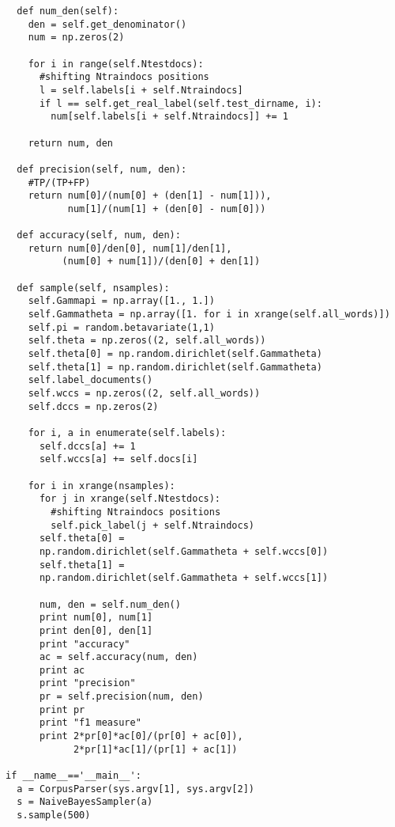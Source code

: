 \begin{lstlisting}
  def num_den(self):
    den = self.get_denominator()
    num = np.zeros(2)
    
    for i in range(self.Ntestdocs):
      #shifting Ntraindocs positions
      l = self.labels[i + self.Ntraindocs] 
      if l == self.get_real_label(self.test_dirname, i):
        num[self.labels[i + self.Ntraindocs]] += 1
    
    return num, den 

  def precision(self, num, den):
    #TP/(TP+FP)
    return num[0]/(num[0] + (den[1] - num[1])), 
           num[1]/(num[1] + (den[0] - num[0]))

  def accuracy(self, num, den):
    return num[0]/den[0], num[1]/den[1], 
          (num[0] + num[1])/(den[0] + den[1])
 
  def sample(self, nsamples):
    self.Gammapi = np.array([1., 1.])
    self.Gammatheta = np.array([1. for i in xrange(self.all_words)])
    self.pi = random.betavariate(1,1)
    self.theta = np.zeros((2, self.all_words)) 
    self.theta[0] = np.random.dirichlet(self.Gammatheta) 
    self.theta[1] = np.random.dirichlet(self.Gammatheta) 
    self.label_documents()
    self.wccs = np.zeros((2, self.all_words))
    self.dccs = np.zeros(2)

    for i, a in enumerate(self.labels):
      self.dccs[a] += 1
      self.wccs[a] += self.docs[i]

    for i in xrange(nsamples):
      for j in xrange(self.Ntestdocs):
        #shifting Ntraindocs positions
        self.pick_label(j + self.Ntraindocs) 
      self.theta[0] =
      np.random.dirichlet(self.Gammatheta + self.wccs[0])
      self.theta[1] = 
      np.random.dirichlet(self.Gammatheta + self.wccs[1])

      num, den = self.num_den()
      print num[0], num[1]
      print den[0], den[1]
      print "accuracy"
      ac = self.accuracy(num, den)
      print ac
      print "precision"
      pr = self.precision(num, den)
      print pr
      print "f1 measure"
      print 2*pr[0]*ac[0]/(pr[0] + ac[0]), 
            2*pr[1]*ac[1]/(pr[1] + ac[1]) 

if __name__=='__main__':
  a = CorpusParser(sys.argv[1], sys.argv[2]) 
  s = NaiveBayesSampler(a)
  s.sample(500)

\end{lstlisting}

